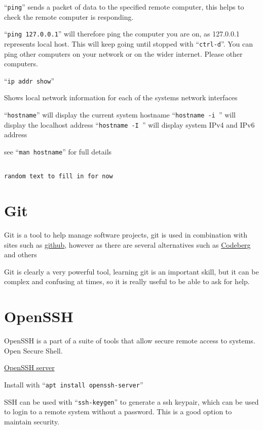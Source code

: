 \documentclass{extbook}
\begin{document}
``\verb|ping|'' sends a packet of data to the specified remote computer, this helps to check the remote computer is responding.

``\verb|ping 127.0.0.1|'' will therefore ping the computer you are on,  as 127.0.0.1 represents local host.  This will keep going until stopped with ``\verb|ctrl-d|''.  You can ping other computers on your network or on the wider internet.  Please  other computers.

``\verb|ip addr show|''

Shows local network information for each of the systems network interfaces

``\verb|hostname|'' will display the current system hostname
``\verb|hostname -i |'' will display the localhost address
``\verb|hostname -I |'' will display system IPv4 and IPv6 address

see ``\verb|man hostname|'' for full details

\begin{verbatim}

random text to fill in for now

\end{verbatim}


\section{Git}

Git is a tool to help manage software projects,  git is used in combination with sites such as \href{https://www.git.com}{github}, however as there are several alternatives such as 
\href{https://codeberg.org/}{Codeberg} and others

Git is clearly a very powerful tool,  learning git is an important skill, but it can be complex and confusing at times, so it is really useful to be able to ask for help. 

\section{OpenSSH}

OpenSSH is a part of a suite of tools that allow secure remote access to systems.  Open Secure Shell.

\href{https://www.openssh.com/}{OpenSSH server}

Install with ``\verb|apt install openssh-server|''

SSH can be used with ``\verb|ssh-keygen|'' to generate a ssh keypair, which can be used to login to a remote system without a password.    This is a good option to maintain security.  
\end{document}
